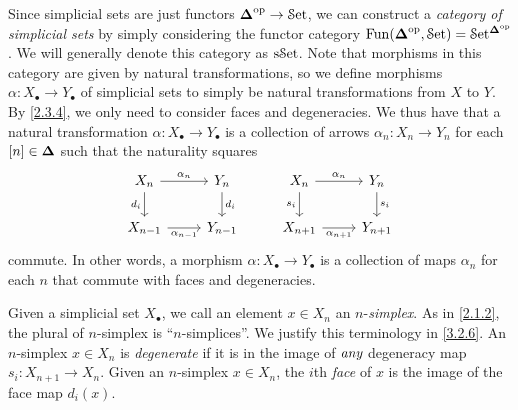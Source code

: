 \begin{remark}\label{3.1.5}
    Since simplicial sets are just functors $\boldsymbol{\Delta}^{\mathrm{op}}\to\mathcal{S}\mathrm{et}$, we can construct a \emph{category of simplicial sets} by simply considering the functor category $\operatorname{Fun}(\boldsymbol{\Delta}^{\mathrm{op}},\mathcal{S}\mathrm{et})=\mathcal{S}\mathrm{et}^{\boldsymbol{\Delta}^{\mathrm{op}}}$. We will generally denote this category as $\mathrm{s}\mathcal{S}\mathrm{et}$. Note that morphisms in this category are given by natural transformations, so we define morphisms $\alpha : X_{\bullet} \to Y_{\bullet}$ of simplicial sets to simply be natural transformations from $X$ to $Y$. By \cref{2.3.4}, we only need to consider faces and degeneracies. We thus have that a natural transformation $\alpha : X_{\bullet} \to Y_{\bullet}$ is a collection of arrows $\alpha_n : X_n \to Y_n$ for each $[n]\in\boldsymbol{\Delta}$ such that the naturality squares
    \[
    \begin{tikzcd}
        X_n \ar["\alpha_n", r]\ar["d_i"', d] & Y_n \ar["d_i", d] & X_n \ar["\alpha_n", r] \ar["s_i"', d] & Y_n \ar["s_i", d]\\
        X_{n-1} \ar["\alpha_{n-1}"', r] & Y_{n-1} & X_{n+1} \ar["\alpha_{n+1}"', r] & Y_{n+1}
    \end{tikzcd}
    \]
    commute. In other words, a morphism $\alpha : X_{\bullet} \to Y_{\bullet}$ is a collection of maps $\alpha_n$ for each $n$ that commute with faces and degeneracies.
\end{remark}

\begin{terminology}\label{3.1.6}
    Given a simplicial set $X_{\bullet}$, we call an element $x\in X_n$ an $n$-\emph{simplex}. As in \cref{2.1.2}, the plural of $n$-simplex is ``$n$-simplices''. We justify this terminology in \cref{3.2.6}. An $n$-simplex $x\in X_n$ is \emph{degenerate} if it is in the image of $\emph{any}$ degeneracy map $s_i : X_{n+1}\to X_n$. Given an $n$-simplex $x\in X_n$, the $i$th \emph{face} of $x$ is the image of the face map $d_i(x)$.
\end{terminology}

